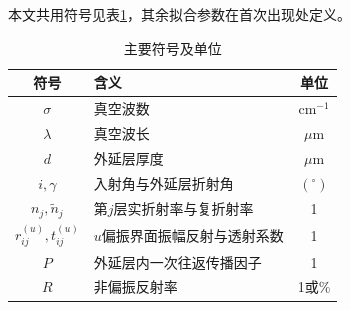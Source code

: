 本文共用符号见表\ref{tab:notation}，其余拟合参数在首次出现处定义。
\begin{table}[!htbp]
\centering
\caption{主要符号及单位}\label{tab:notation}
\begin{tabular}{clc}
\toprule
符号 & 含义 & 单位\\
\midrule
$\sigma$ & 真空波数 & $\mathrm{cm}^{-1}$\\
$\lambda$ & 真空波长 & $\mu\mathrm m$\\
$d$ & 外延层厚度 & $\mu\mathrm m$\\
$i,\gamma$ & 入射角与外延层折射角 & $(^\circ)$\\
$n_j,\widetilde n_j$ & 第$j$层实折射率与复折射率 & 1\\
$r_{ij}^{(u)},t_{ij}^{(u)}$ & $u$偏振界面振幅反射与透射系数 & 1\\
$P$ & 外延层内一次往返传播因子 & 1\\
$R$ & 非偏振反射率 & 1或\%\\
\bottomrule
\end{tabular}
\end{table}
